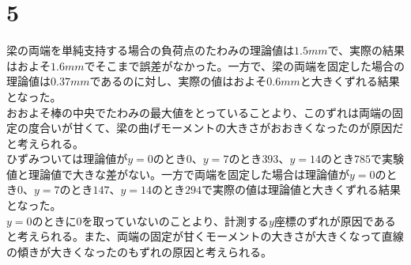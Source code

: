 \documentclass[pdflatex,ja=standard,fleqn]{bxjsarticle}
\begin{document}
\section*{5}
梁の両端を単純支持する場合の負荷点のたわみの理論値は$1.5mm$で、実際の結果はおよそ$1.6mm$でそこまで誤差がなかった。一方で、梁の両端を固定した場合の理論値は$0.37mm$であるのに対し、実際の値はおよそ$0.6mm$と大きくずれる結果となった。\\
おおよそ棒の中央でたわみの最大値をとっていることより、このずれは両端の固定の度合いが甘くて、梁の曲げモーメントの大きさがおおきくなったのが原因だと考えられる。\\
ひずみついては理論値が$y=0$のとき$0$、$y=7$のとき$393$、$y=14$のとき$785$で実験値と理論値で大きな差がない。一方で両端を固定した場合は理論値が$y=0$のとき$0$、$y=7$のとき$147$、$y=14$のとき$294$で実際の値は理論値と大きくずれる結果となった。\\
$y=0$のときに$0$を取っていないのことより、計測する$y$座標のずれが原因であると考えられる。また、両端の固定が甘くモーメントの大きさが大きくなって直線の傾きが大きくなったのもずれの原因と考えられる。\\
\end{document}
